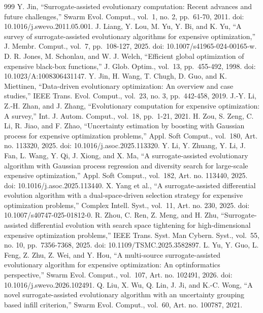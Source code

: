 \documentclass[cmc,article,submit,moreauthors,pdftex]{Definitions/tsp}
\begin{document}
\begin{thebibliography}{999}
Y. Jin, ``Surrogate-assisted evolutionary computation: Recent advances and future challenges,'' Swarm Evol. Comput., vol.~1, no. 2, pp.~61-70, 2011. doi: 10.1016/j.swevo.2011.05.001.
J. Liang, Y. Lou, M. Yu, Y. Bi, and K. Yu, ``A survey of surrogate-assisted evolutionary algorithms for expensive optimization,'' J. Membr. Comput., vol.~7, pp.~108-127, 2025. doi: 10.1007/s41965-024-00165-w.
D. R. Jones, M. Schonlau, and W. J. Welch, ``Efficient global optimization of expensive black-box functions,'' J. Glob. Optim., vol.~13, pp.~455-492, 1998. doi: 10.1023/A:1008306431147.
Y. Jin, H. Wang, T. Chugh, D. Guo, and K. Miettinen, ``Data-driven evolutionary optimization: An overview and case studies,'' IEEE Trans. Evol. Comput., vol.~23, no. 3, pp.~442-458, 2019.
J.-Y. Li, Z.-H. Zhan, and J. Zhang, ``Evolutionary computation for expensive optimization: A survey,'' Int. J. Autom. Comput., vol.~18, pp.~1-21, 2021.
H. Zou, S. Zeng, C. Li, R. Jiao, and F. Zhao, ``Uncertainty estimation by boosting with Gaussian process for expensive optimization problems,'' Appl. Soft Comput., vol.~180, Art. no. 113320, 2025. doi: 10.1016/j.asoc.2025.113320.
Y. Li, Y. Zhuang, Y. Li, J. Fan, L. Wang, Y. Qi, J. Xiong, and X. Ma, ``A surrogate-assisted evolutionary algorithm with Gaussian process regression and diversity search for large-scale expensive optimization,'' Appl. Soft Comput., vol.~182, Art. no. 113440, 2025. doi: 10.1016/j.asoc.2025.113440.
X. Yang et al., ``A surrogate-assisted differential evolution algorithm with a dual-space-driven selection strategy for expensive optimization problems,'' Complex Intell. Syst., vol.~11, Art. no. 230, 2025. doi: 10.1007/s40747-025-01812-0.
R. Zhou, C. Ren, Z. Meng, and H. Zhu, ``Surrogate-assisted differential evolution with search space tightening for high-dimensional expensive optimization problems,'' IEEE Trans. Syst. Man Cybern. Syst., vol.~55, no. 10, pp.~7356-7368, 2025. doi: 10.1109/TSMC.2025.3582897.
L. Yu, Y. Guo, L. Feng, Z. Zhu, Z. Wei, and Y. Hou, ``A multi-source surrogate-assisted evolutionary algorithm for expensive optimization: An optinformatics perspective,'' Swarm Evol. Comput., vol.~107, Art. no. 102491, 2026. doi: 10.1016/j.swevo.2026.102491.
Q. Liu, X. Wu, Q. Lin, J. Ji, and K.-C. Wong, ``A novel surrogate-assisted evolutionary algorithm with an uncertainty grouping based infill criterion,'' Swarm Evol. Comput., vol.~60, Art. no. 100787, 2021.

\end{thebibliography}
\end{document}
